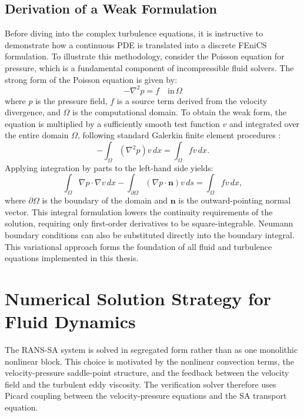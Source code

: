 \subsection{Derivation of a Weak Formulation}
Before diving into the complex turbulence equations, it is instructive to demonstrate how a continuous PDE is translated into a discrete FEniCS formulation. To illustrate this methodology, consider the Poisson equation for pressure, which is a fundamental component of incompressible fluid solvers. The strong form of the Poisson equation is given by:
\begin{equation}
	-\nabla^2 p = f \quad \text{in} \, \Omega
\end{equation}
where $p$ is the pressure field, $f$ is a source term derived from the velocity divergence, and $\Omega$ is the computational domain. To obtain the weak form, the equation is multiplied by a sufficiently smooth test function $v$ and integrated over the entire domain $\Omega$, following standard Galerkin finite element procedures \cite{Logg2012, Langtangen2016}:
\begin{equation}
	-\int_{\Omega} (\nabla^2 p) v \, dx = \int_{\Omega} f v \, dx .
\end{equation}
Applying integration by parts to the left-hand side yields:
\begin{equation}
	\int_{\Omega} \nabla p \cdot \nabla v \, dx - \int_{\partial \Omega} (\nabla p \cdot \mathbf{n}) v \, ds = \int_{\Omega} f v \, dx ,
\end{equation}
where $\partial \Omega$ is the boundary of the domain and $\mathbf{n}$ is the outward-pointing normal vector. This integral formulation lowers the continuity requirements of the solution, requiring only first-order derivatives to be square-integrable. Neumann boundary conditions can also be substituted directly into the boundary integral. This variational approach forms the foundation of all fluid and turbulence equations implemented in this thesis.

\section{Numerical Solution Strategy for Fluid Dynamics}
The RANS-SA system is solved in segregated form rather than as one monolithic nonlinear block. This choice is motivated by the nonlinear convection terms, the velocity-pressure saddle-point structure, and the feedback between the velocity field and the turbulent eddy viscosity. The verification solver therefore uses Picard coupling between the velocity-pressure equations and the SA transport equation.

